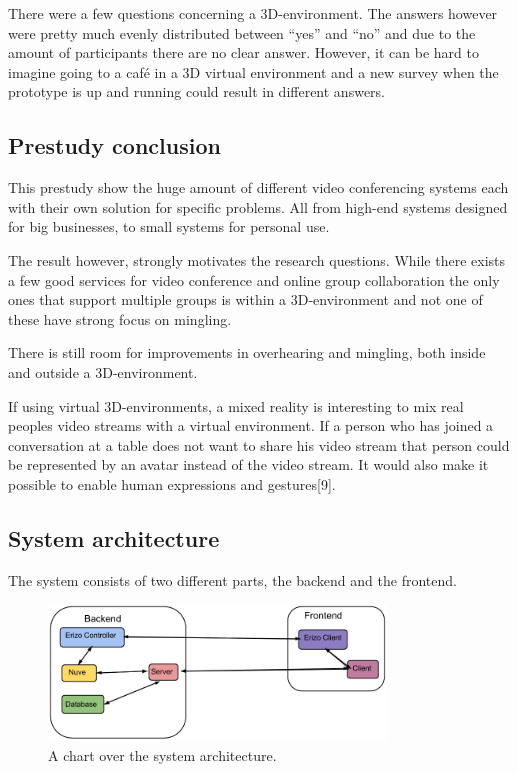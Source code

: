 \documentclass[12pt, titlepage]{article}
\begin{document}
There were a few questions concerning a 3D-environment. The answers however were pretty much evenly distributed between “yes” and “no” and due to the amount of participants there are no clear answer. However, it can be hard to imagine going to a café in a 3D virtual environment and a new survey when the prototype is up and running could result in different answers.
\subsection{Prestudy conclusion}
This prestudy show the huge amount of different video conferencing systems each with their own solution for specific problems. All from high-end systems designed for big businesses, to small systems for personal use.

The result however, strongly motivates the research questions. While there exists a few good services for video conference and online group collaboration the only ones that support multiple groups is within a 3D-environment and not one of these have strong focus on mingling.

There is still room for improvements in overhearing and mingling, both inside and outside a 3D-environment.

If using virtual 3D-environments, a mixed reality is interesting to mix real peoples video streams with a virtual environment. If a person who has joined a conversation at a table does not want to share his video stream that person could be represented by an avatar instead of the video stream. It would also make it possible to enable human expressions and gestures[9].
\subsection{System architecture}
The system consists of two different parts, the backend and the frontend.
\begin{figure}[H]
  \centering
	\includegraphics[width=0.8\textwidth,keepaspectratio]{systemarchitecture.png}
  \caption{A chart over the system architecture.}
\end{figure}
\end{document}
